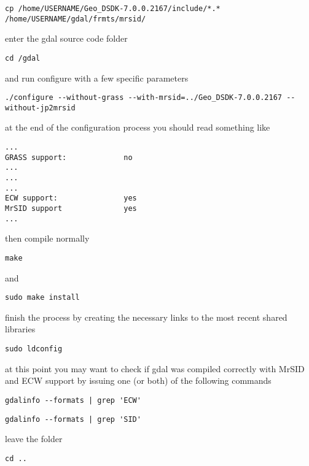 \begin{verbatim}
cp /home/USERNAME/Geo_DSDK-7.0.0.2167/include/*.* /home/USERNAME/gdal/frmts/mrsid/
\end{verbatim}

enter the gdal source code folder

\begin{verbatim}
cd /gdal
\end{verbatim}

and run configure with a few specific parameters

\begin{verbatim}
./configure --without-grass --with-mrsid=../Geo_DSDK-7.0.0.2167 --without-jp2mrsid
\end{verbatim}

at the end of the configuration process you should read something like

\begin{verbatim}
...
GRASS support:             no
...
...
...
ECW support:               yes
MrSID support              yes			
...
\end{verbatim}

then compile normally

\begin{verbatim}
make
\end{verbatim}

and

\begin{verbatim}
sudo make install
\end{verbatim}

finish the process by creating the necessary links to the most recent shared libraries

\begin{verbatim}
sudo ldconfig
\end{verbatim}

at this point you may want to check if gdal was compiled correctly with MrSID and ECW
support by issuing one (or both) of the following commands

\begin{verbatim}
gdalinfo --formats | grep 'ECW'
\end{verbatim}

\begin{verbatim}
gdalinfo --formats | grep 'SID'
\end{verbatim}

leave the folder 

\begin{verbatim}
cd ..
\end{verbatim}

